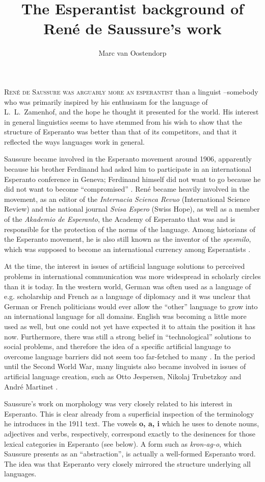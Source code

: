 \documentclass[output=paper]{langsci/langscibook}
\author{Marc van Oostendorp\affiliation{Radboud University and The Meertens Institute}}
\title{The Esperantist background of René de Saussure's work}
\begin{document}
   \label{sec:esperanto}
\lettrine[loversize=0.1, nindent=0.25em]{R}{ené de Saussure was arguably more an esperantist} 
than a linguist --\linebreak somebody who was primarily inspired by his enthusiasm for the language of
L.\ L.\ Zamenhof, and the hope he thought it presented for the world. His
interest in general linguistics seems to have stemmed from his wish to
show that the structure of Esperanto was better than that of its
competitors, and that it reflected the ways languages work in general.

Saussure became involved in the Esperanto movement around 1906,
apparently because his brother Ferdinand had asked him to participate
in an international Esperanto conference in Geneva; Ferdinand himself
did not want to go because he did not want to become ``compromised''
\citep{kuenzli2015}.  René became heavily involved in the movement, as
an editor of the \emph{Internacia Scienca Revuo} (International
Science Review) and the national journal \emph{Svisa Espero} (Swiss
Hope), as well as a member of the \emph{Akademio de Esperanto}, the
Academy of Esperanto that was and is responsible for the protection of
the norms of the language. Among historians of the Esperanto movement,
he is also still known as the inventor of the \emph{spesmilo}, which
was supposed to become an international currency among Esperantists
\citep{garvia2015}.

At the time, the interest in issues of artificial language solutions
to perceived problems in international communication was more
widespread in scholarly circles than it is today. In the western
world, German was often used as a language of e.g. scholarship and
French as a language of diplomacy and it was unclear that German or
French politicians would ever allow the ``other'' language to grow into
an international language for all domains. English was becoming a
little more used as well, but one could not yet have expected it to
attain the position it has now. Furthermore, there was still a strong
belief in ``technological'' solutions to social problems, and therefore
the idea of a specific artificial language to overcome language
barriers did not seem too far-fetched to many \citep{gordin2015}. In
the period until the Second World War, many linguists also became
involved in issues of artificial language creation, such as Otto
Jespersen, Nikolaj Trubetzkoy and Andr\'e Martinet
\citep{vanoostendorp2004}.

Saussure's work on morphology was very closely related to his interest
in Esperanto. This is clear already from a superficial inspection of
the terminology he introduces in the 1911 text. The vowels \textbf{o,
  a, i} which he uses to denote nouns, adjectives and verbs,
respectively, correspond exactly to the desinences for those lexical
categories in Esperanto (see below). A form such as \emph{kron-ag-o},
which Saussure presents as an ``abstraction'', is actually a well-formed
Esperanto word. The idea was that Esperanto very closely mirrored the
structure underlying all languages.
\end{document}
